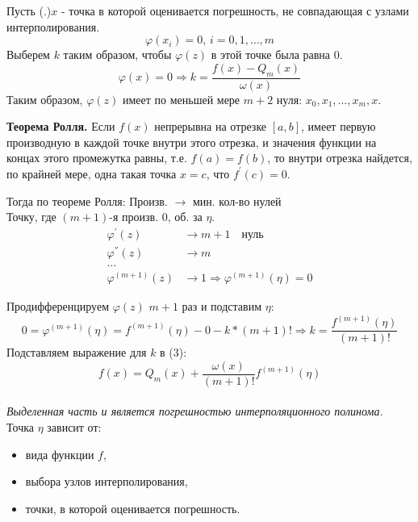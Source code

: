 \documentclass[a4paper,11pt]{article}
\begin{document}
Пусть (.)$x$ - точка в которой оценивается погрешность, не совпадающая с узлами интерполирования.
\[\varphi(x_i) = 0, \, i = 0, 1, \dots, m\]
Выберем $k$ таким образом, чтобы $\varphi(z)$ в этой точке была равна $0$.
\begin{equation}
  \varphi(x) = 0 \Rightarrow k = \frac{f(x) - Q_m(x)}{\omega(x)}
\end{equation}
Таким образом, $\varphi(z)$ имеет по меньшей мере $m+2$ нуля: $x_0, x_1, \dots, x_m, x$. \\
\begin{importantblock}
  \textbf{Теорема Ролля.}
  Если $f(x)$ непрерывна на отрезке $[a,b]$, имеет первую производную в каждой точке внутри этого отрезка, и значения функции на концах этого промежутка равны, т.е. $f(a)=f(b)$, то внутри отрезка найдется, по крайней мере, одна такая точка $x=c$, что $f^{'}(c)=0$.
\end{importantblock}
Тогда по теореме Ролля:
\marginpar
{
  \footnotesize Произв. $\rightarrow$ мин. кол-во нулей \\

  \footnotesize Точку, где $(m+1)$-я произв. 0, об. за $\eta$.
}
\begin{align*}
  \varphi^{'}(z) & \rightarrow m + 1 \quad \text{нуль} \\
  \varphi^{''}(z) & \rightarrow m \\
  \dots \\
  \varphi^{(m + 1)}(z) & \rightarrow 1 \Rightarrow \varphi^{(m + 1)}(\eta) = 0
\end{align*}

Продифференцируем $\varphi(z)$ $m+1$ раз и подставим $\eta$:
\[0 = \varphi^{(m+1)}(\eta) = f^{(m+1)}(\eta) - 0 - k * (m + 1)! \Rightarrow k = \frac{f^{(m+1)}(\eta)}{(m+1)!}\]
Подставляем выражение для $k$ в (3):
\[f(x) = Q_m(x) + \boxed{\frac{\omega(x)}{(m+1)!}f^{(m+1)}(\eta)}\] \\
\textit{Выделенная часть и является погрешностью интерполяционного полинома.}
Точка $\eta$ зависит от:
\begin{itemize}
  \item вида функции $f$,
  \item выбора узлов интерполирования,
  \item точки, в которой оценивается погрешность.
\end{itemize}
\end{document}
